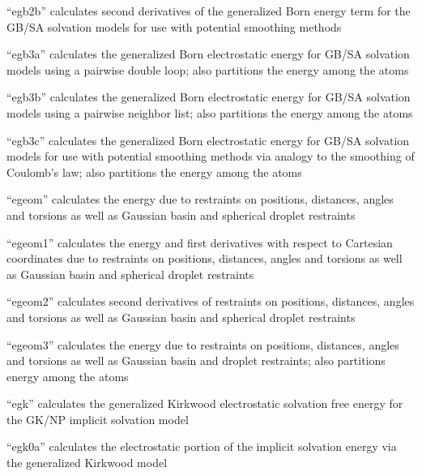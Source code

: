 \documentclass[letterpaper,11pt,english]{sphinxmanual}
\begin{document}
“egb2b” calculates second derivatives of the generalized
Born energy term for the GB/SA solvation models for use with
potential smoothing methods


“egb3a” calculates the generalized Born electrostatic energy
for GB/SA solvation models using a pairwise double loop; also
partitions the energy among the atoms


“egb3b” calculates the generalized Born electrostatic energy
for GB/SA solvation models using a pairwise neighbor list; also
partitions the energy among the atoms


“egb3c” calculates the generalized Born electrostatic energy
for GB/SA solvation models for use with potential smoothing
methods via analogy to the smoothing of Coulomb’s law; also
partitions the energy among the atoms


“egeom” calculates the energy due to restraints on positions,
distances, angles and torsions as well as Gaussian basin and
spherical droplet restraints


“egeom1” calculates the energy and first derivatives
with respect to Cartesian coordinates due to restraints
on positions, distances, angles and torsions as well as
Gaussian basin and spherical droplet restraints


“egeom2” calculates second derivatives of restraints
on positions, distances, angles and torsions as well
as Gaussian basin and spherical droplet restraints


“egeom3” calculates the energy due to restraints on positions,
distances, angles and torsions as well as Gaussian basin and
droplet restraints; also partitions energy among the atoms


“egk” calculates the generalized Kirkwood electrostatic
solvation free energy for the GK/NP implicit solvation model


“egk0a” calculates the electrostatic portion of the implicit
solvation energy via the generalized Kirkwood model
\end{document}
